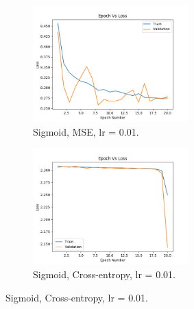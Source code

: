 \documentclass[12pt]{article}
\begin{document}
\begin{figure}
\begin{framed}
				\begin{subfigure}{5.5cm}
					\centering
					\includegraphics[width=6cm]{../Images/Epoch_VS_Loss/Sigmoid_MSE_001.png}
					\captionsetup{justification=centering,margin=1cm}
					\caption{Sigmoid, MSE, lr = 0.01.}
					\label{fig:sub3}
				\end{subfigure}
				\begin{subfigure}{5.5cm}
					\centering
					\includegraphics[width=6cm]{../Images/Epoch_VS_Loss/Sigmoid_cross-entropy_001.png}
					\captionsetup{justification=centering,margin=0.6cm}
					\caption{Sigmoid, Cross-entropy, lr = 0.01.}
					\label{fig:sub4}
				\end{subfigure}%
			

\end{framed}
\end{figure}
\end{document}
